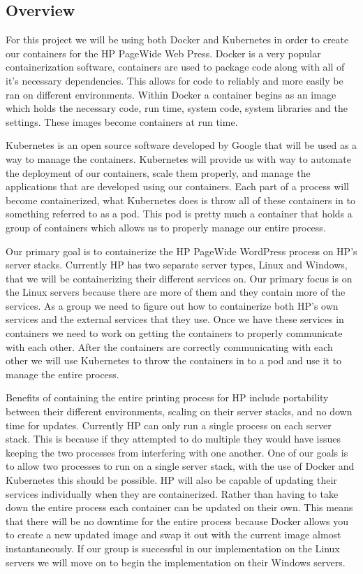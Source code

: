 \documentclass[onecolumn, draftclsnofoot,10pt, compsoc]{IEEEtran}
\begin{document}
\subsection{Overview}
For this project we will be using both Docker and Kubernetes in order to create our containers for the HP PageWide Web Press. 
Docker is a very popular containerization software, containers are used to package code along with all of it’s necessary dependencies. 
This allows for code to reliably and more easily be ran on different environments. 
Within Docker a container begins as an image which holds the necessary code, run time, system code, system libraries and the settings. 
These images become containers at run time\cite{kub}. 

Kubernetes is an open source software developed by Google that will be used as a way to manage the containers. 
Kubernetes will provide us with way to automate the deployment of our containers, scale them properly, and manage the applications that are developed using our containers. 
Each part of a process will become containerized, what Kubernetes does is throw all of these containers in to something referred to as a pod. 
This pod is pretty much a container that holds a group of containers which allows us to properly manage our entire process\cite{docker}. 

Our primary goal is to containerize the HP PageWide WordPress process on HP’s server stacks. 
Currently HP has two separate server types, Linux and Windows, that we will be containerizing their different services on. 
Our primary focus is on the Linux servers because there are more of them and they contain more of the services. 
As a group we need to figure out how to containerize both HP’s own services and the external services that they use. 
Once we have these services in containers we need to work on getting the containers to properly communicate with each other. 
After the containers are correctly communicating with each other we will use Kubernetes to throw the containers in to a pod and use it to manage the entire process.

Benefits of containing the entire printing process for HP include portability between their different environments, scaling on their server stacks, and no down time for updates. 
Currently HP can only run a single process on each server stack. 
This is because if they attempted to do multiple they would have issues keeping the two processes from interfering with one another. 
One of our goals is to allow two processes to run on a single server stack, with the use of Docker and Kubernetes this should be possible. 
HP will also be capable of updating their services individually when they are containerized. 
Rather than having to take down the entire process each container can be updated on their own. 
This means that there will be no downtime for the entire process because Docker allows you to create a new updated image and swap it out with the current image almost instantaneously. 
If our group is successful in our implementation on the Linux servers we will move on to begin the implementation on their Windows servers.
\end{document}
